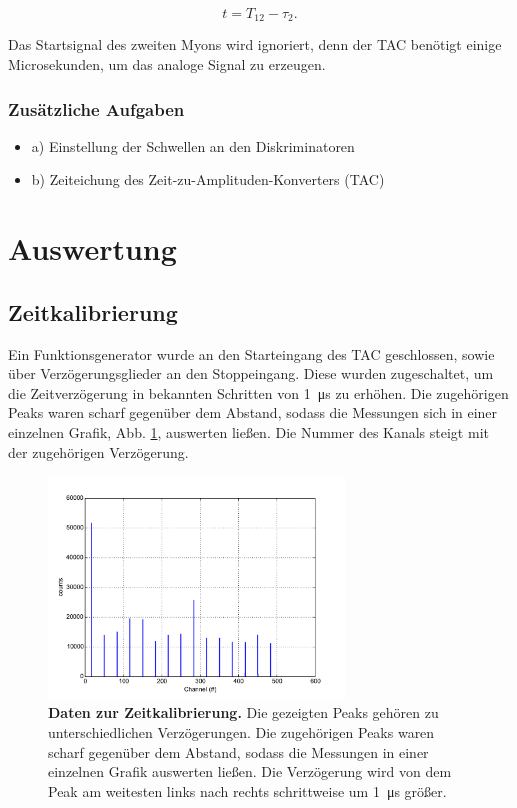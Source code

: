 \documentclass[a4paper,ngerman]{scrartcl}
\begin{document}
\begin{equation}
t = T_{12} - \tau_2 .
\end{equation}

Das Startsignal des zweiten Myons wird ignoriert, denn der TAC benötigt einige Microsekunden, um das analoge Signal zu erzeugen.



\subsubsection{Zusätzliche Aufgaben}

\begin{itemize}
\item a) Einstellung der Schwellen an den Diskriminatoren
\item b) Zeiteichung des Zeit-zu-Amplituden-Konverters (TAC)
\end{itemize}

\newpage

\section{Auswertung}

\subsection{Zeitkalibrierung}

Ein Funktionsgenerator wurde an den Starteingang des TAC geschlossen, sowie über Verzögerungsglieder an den Stoppeingang. Diese wurden zugeschaltet, um die Zeitverzögerung in bekannten Schritten von \SI{1}{\micro\second} zu erhöhen. Die zugehörigen Peaks waren scharf gegenüber dem Abstand, sodass die Messungen sich in einer einzelnen Grafik, Abb. \ref{fig:zeitkalibrierung_hist}, auswerten ließen. Die Nummer des Kanals steigt mit der zugehörigen Verzögerung. 

\begin{figure}[tb!]
\centering
\includegraphics[width=0.7\textwidth]{abbildungen/zeitkalibrierung_hist.pdf}
\caption[Daten zur Zeitkalibrierung]{\textbf{Daten zur Zeitkalibrierung.} Die gezeigten Peaks gehören zu unterschiedlichen Verzögerungen. Die zugehörigen Peaks waren scharf gegenüber dem Abstand, sodass die Messungen in einer einzelnen Grafik auswerten ließen. Die Verzögerung wird von dem Peak am weitesten links nach rechts schrittweise um \SI{1}{\micro\second} größer.}
\label{fig:zeitkalibrierung_hist}
\end{figure}
\end{document}
